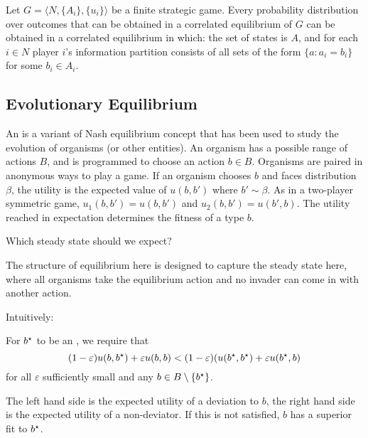 \documentclass[10pt]{article}
\begin{document}
\begin{theorem}
	 Let $G = \langle N ,\{A_i\},\{u_i\}\rangle$ be a finite strategic game. Every probability distribution over outcomes that can be obtained in a correlated equilibrium of $G$ can be obtained in a correlated equilibrium in which: the set of states is $A$, and for each $i\in N$ player $i$'s information partition consists of all sets of the form $\{a : a_i = b_i\}$ for some $b_i \in A_i$.
\end{theorem}

\subsection{Evolutionary Equilibrium}

\begin{definition}
	An  is a variant of Nash equilibrium concept that has been used to study the evolution of organisms (or other entities). An organism has a possible range of actions $B$, and is programmed to choose an action $b \in B$. Organisms are paired in anonymous ways to play a game. If an organism chooses $b$ and faces distribution $\beta$, the utility is the expected value of $u(b,b')$ where $b' \sim \beta$. As in a two-player symmetric game, $u_1(b,b') = u(b,b')$ and $u_2(b,b') = u(b',b)$. The utility reached in expectation determines the fitness of a type $b$. 
	
	\begin{question}Which steady state should we expect? \end{question}
	The structure of equilibrium here is designed to capture the steady state here, where all organisms take the equilibrium action and no invader can come in with another action.
\end{definition}

 Intuitively:

\begin{definition}
	For $b^\star$ to be an , we require that \[(1-\varepsilon)u(b,b^\star) + \varepsilon u(b,b) < (1-\varepsilon)(u(b^\star,b^\star) + \varepsilon u(b^\star,b)\]for all $\varepsilon$ sufficiently small and any $b \in B \setminus \{b^\star\}$.
\end{definition}

\begin{remark}
	The left hand side is the expected utility of a deviation to $b$, the right hand side is the expected utility of a non-deviator. If this is not satisfied, $b$ has a superior fit to $b^\star$.
\end{remark}
\end{document}
